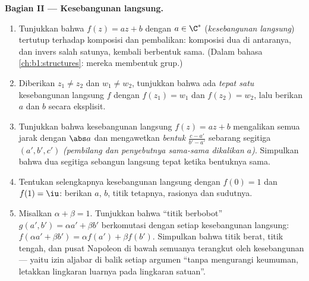 \begin{problem}
\medskip
\noindent\textbf{Bagian II --- Kesebangunan langsung.}
\begin{enumerate}[resume]
  \item Tunjukkan bahwa  $f(z) = az + b$ dengan $a \in \C^*$
        (\emph{kesebangunan langsung}) tertutup terhadap komposisi
        dan pembalikan: komposisi dua di antaranya, dan
        invers salah satunya, kembali berbentuk sama. (Dalam
        bahasa \cref{ch:b1:structures}: mereka membentuk grup.)
  \item Diberikan $z_1 \neq z_2$ dan $w_1 \neq w_2$, tunjukkan bahwa ada
        \emph{tepat satu} kesebangunan langsung $f$ dengan $f(z_1) = w_1$ dan
        $f(z_2) = w_2$, lalu berikan $a$ dan $b$ secara eksplisit.
  \item Tunjukkan bahwa kesebangunan langsung $f(z) = az + b$ mengalikan
        semua jarak dengan $\abs a$ dan mengawetkan \emph{bentuk}
        $\frac{c - a'}{b' - a'}$ sebarang segitiga $(a', b', c')$
        \emph{(pembilang dan penyebutnya sama-sama dikalikan
        $a$)}. Simpulkan bahwa dua segitiga sebangun langsung
        tepat ketika bentuknya sama.
  \item Tentukan selengkapnya kesebangunan langsung dengan $f(0) = 1$
        dan $f(1) = \iu$: berikan $a$, $b$, titik tetapnya, rasionya
        dan sudutnya.
  \item Misalkan $\alpha + \beta = 1$. Tunjukkan bahwa ``titik berbobot''
        $g(a', b') = \alpha a' + \beta b'$ berkomutasi dengan setiap
        kesebangunan langsung: $f(\alpha a' + \beta b') = \alpha f(a')
        + \beta f(b')$. Simpulkan bahwa titik berat, titik tengah, dan
        pusat Napoleon di bawah semuanya terangkut oleh kesebangunan
        --- yaitu izin aljabar di balik setiap argumen ``tanpa mengurangi
        keumuman, letakkan lingkaran luarnya pada lingkaran satuan''.
\end{enumerate}


\end{problem}
